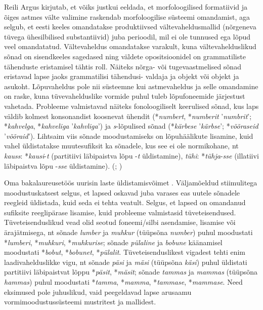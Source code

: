 \documentclass[12pt]{article}
\begin{document}
Reili Argus \citep[23]{ARGUSdiss} kirjutab, et võiks justkui eeldada, et morfoloogilised formatiivid ja õiges astmes välte valimine raskendab morfoloogilise süsteemi omandamist, aga selgub, et eesti keeles omandatakse produktiivsed vältevaheldusmallid (nõrgeneva tüvega ühesilbilised substantiivid) juba perioodil, mil ei ole tunnused ega lõpud veel omandatatud. Vältevaheldus omandatakse varakult, kuna vältevahelduslikud sõnad on sisendkeeles sagedased ning väldete opositsioonidel on grammatiliste tähenduste eristamisel tähtis roll. Näiteks nõrga- või tugevaastmelised sõnad eristavad lapse jaoks grammatilisi tähendusi- valdaja ja objekt või objekt ja asukoht. Lõpuvaheldus pole nii süsteemne kui astmevaheldus ja selle omandamine on raske, kuna tüvevahelduslike vormide puhul tuleb lõpufoneemide järjestust vahetada. 
Probleeme valmistavad näiteks fonoloogiliselt keerulised sõnad, kus laps väldib kolmest konsonandist koosnevat ühendit (*\emph{numbert}, *\emph{numberit} ’\emph{numbrit}’; *\emph{kahvelga}, *\emph{kahveliga} ’\emph{kahvliga}’) ja \emph{s}-lõpulised sõnad (*\emph{kärbese} ’\emph{kärbse}’; *\emph{võõraseid} ’\emph{võõraid}’). Lihtsaim viis sõnade moodustamiseks on lõpuhäälikute lisamine, kuid vahel üldistatakse muutesufiksit ka sõnadele, kus see ei ole normikohane, nt \emph{kauss}: *\emph{kausi}-\emph{t} (partitiivi läbipaistva lõpu -\emph{t} üldistamine), \emph{tühi}: *\emph{tühja}-\emph{sse} (illatiivi läbipaistva lõpu -\emph{sse} üldistamine). (\citealp[23--24, 26--27]{ARGUSdiss}; \citealp[20--21]{ARGUS_2})

Oma bakalaureusetöös uurisin laste üldistamisvõimet \citep{Vaik}. Väljamõeldud stiimulitega moodustuskatsest selgus, et lapsed oskavad juba varases eas uutele sõnadele reegleid üldistada, kuid seda ei tehta veatult. Selgus, et lapsed on omandanud sufiksite reeglipärase lisamise, kuid probleeme valmistasid tüveteisendused. Tüveteisenduslikud vead olid seotud foneemi/silbi asendamise, lisamise või ärajätmisega, nt sõnade \emph{lumber} ja \emph{muhkur} (tüüpsõna \emph{number}) puhul moodustati *\emph{lumberi}, *\emph{muhkuri}, *\emph{muhkurise}; sõnade \emph{pülaline} ja \emph{bobune} käänamisel moodustati *\emph{bobut}, *\emph{bobunet}, *\emph{pülalit}. Tüveteisenduslikest vigadest tehti enim laadivahelduslikke vigu, nt sõnade \emph{päsi} ja \emph{mäsi} (tüüpsõna \emph{käsi}) puhul üldistati partitiivi läbipaistvat lõppu *\emph{päsit}, *\emph{mäsit}; sõnade \emph{tammas} ja \emph{mammas} (tüüpsõna \emph{hammas}) puhul moodustati *\emph{tamma}, *\emph{mamma}, *\emph{tammase}, *\emph{mammase}. \citep{Vaik} Need eksimused pole juhuslikud, vaid peegeldavad lapse  arusaamu vormimoodustussüsteemi mustritest ja mallidest.
\end{document}
